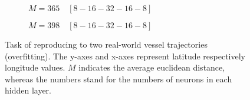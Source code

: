 \begin{figure}[H]\ContinuedFloat
     \begin{subfigure}[b]{0.48\textwidth}
         \centering
             
         \caption{$M=365 \quad [8-16-32-16-8]$}
         \label{fig:double5}
     \end{subfigure}
               \hfill
     \begin{subfigure}[b]{0.48\textwidth}
         \centering
             
         \caption{$M=398 \quad [8-16-32-16-8]$}
         \label{fig:double6}
     \end{subfigure}
     \caption{Task of reproducing to two real-world vessel trajectories (overfitting). The y-axes and x-axes represent latitude respectively longitude values. $M$ indicates the average euclidean distance, whereas the numbers stand for the numbers of neurons in each hidden layer.}
     \label{fig:double}
\end{figure}

